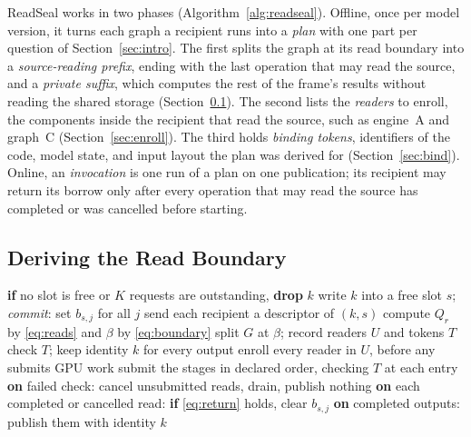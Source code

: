 \documentclass[conference]{IEEEtran}
\begin{document}
ReadSeal works in two phases (Algorithm~\ref{alg:readseal}). Offline, once per model version, it turns each graph a recipient runs into a \emph{plan} with one part per question of Section~\ref{sec:intro}. The first splits the graph at its read boundary into a \emph{source-reading prefix}, ending with the last operation that may read the source, and a \emph{private suffix}, which computes the rest of the frame's results without reading the shared storage (Section~\ref{sec:derive}). The second lists the \emph{readers} to enroll, the components inside the recipient that read the source, such as engine~A and graph~C (Section~\ref{sec:enroll}). The third holds \emph{binding tokens}, identifiers of the code, model state, and input layout the plan was derived for (Section~\ref{sec:bind}). Online, an \emph{invocation} is one run of a plan on one publication; its recipient may return its borrow only after every operation that may read the source has completed or was cancelled before starting.

\subsection{Deriving the Read Boundary}
\label{sec:derive}

\begin{algorithm}[t]
\caption{BIM's commit and ReadSeal's plan and invocation}
\label{alg:readseal}
\footnotesize
\begin{algorithmic}[1]
\State \textbf{if} no slot is free or $K$ requests are outstanding, \textbf{drop} $k$
\State write $k$ into a free slot $s$; \emph{commit}: set $b_{s,j}$ for all $j$
\State send each recipient a descriptor of $(k,s)$
\EndProcedure
{}
\State compute $Q_r$ by \eqref{eq:reads} and $\beta$ by \eqref{eq:boundary}
\State split $G$ at $\beta$; record readers $U$ and tokens $T$
\EndProcedure
{}
\State check $T$; keep identity $k$ for every output
\State enroll every reader in $U$, before any submits GPU work
\State submit the stages in declared order, checking $T$ at each entry
\State \textbf{on} failed check: cancel unsubmitted reads, drain, publish nothing
\State \textbf{on} each completed or cancelled read: \textbf{if} \eqref{eq:return} holds, clear $b_{s,j}$
\State \textbf{on} completed outputs: publish them with identity $k$
\EndProcedure
\end{algorithmic}
\end{algorithm}
\end{document}
